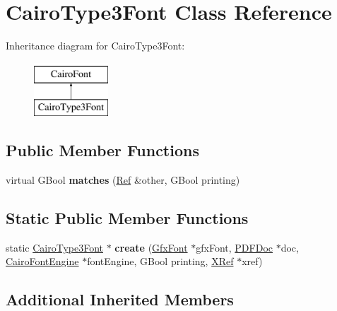 \hypertarget{class_cairo_type3_font}{}\section{Cairo\+Type3\+Font Class Reference}
\label{class_cairo_type3_font}
Inheritance diagram for Cairo\+Type3\+Font\+:\begin{figure}[H]
\begin{center}
\leavevmode
\includegraphics[height=2.000000cm]{class_cairo_type3_font}
\end{center}
\end{figure}
\subsection*{Public Member Functions}
\begin{DoxyCompactItemize}
\item 
\mbox{\label{class_cairo_type3_font_aea3d05d47e50c2bec2009461867b6f54}} 
virtual G\+Bool {\bfseries matches} (\hyperlink{struct_ref}{Ref} \&other, G\+Bool printing)
\end{DoxyCompactItemize}
\subsection*{Static Public Member Functions}
\begin{DoxyCompactItemize}
\item 
\mbox{\label{class_cairo_type3_font_aaa713018f33fe499c9fa5231813a0e33}} 
static \hyperlink{class_cairo_type3_font}{Cairo\+Type3\+Font} $\ast$ {\bfseries create} (\hyperlink{class_gfx_font}{Gfx\+Font} $\ast$gfx\+Font, \hyperlink{class_p_d_f_doc}{P\+D\+F\+Doc} $\ast$doc, \hyperlink{class_cairo_font_engine}{Cairo\+Font\+Engine} $\ast$font\+Engine, G\+Bool printing, \hyperlink{class_x_ref}{X\+Ref} $\ast$xref)
\end{DoxyCompactItemize}
\subsection*{Additional Inherited Members}


